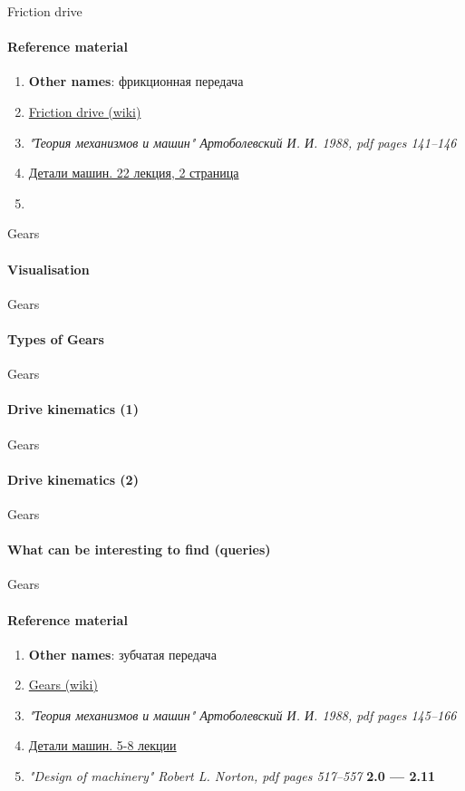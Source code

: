 \documentclass[aspectratio=169]{beamer}
\begin{document}
\begin{frame}[t]{Friction drive}
    \framesubtitle{Reference material}
    \begin{enumerate}
        \item \textbf{Other names}: фрикционная передача
        \item \href{https://en.m.wikipedia.org/wiki/Friction_drive}{Friction drive (wiki)}
        \item \textit{"Теория механизмов и машин" Артоболевский И. И. 1988, pdf pages 141--146 }
        \item \href{https://studfile.net/preview/2156467/page:2/}{Детали машин. 22 лекция, 2 страница}
        \item 
    \end{enumerate}
\end{frame}

\begin{frame}[t]{Gears}
    \framesubtitle{Visualisation}

\end{frame}

\begin{frame}[t]{Gears}
    \framesubtitle{Types of Gears}

\end{frame}

\begin{frame}[t]{Gears}
    \framesubtitle{Drive kinematics (1)}

\end{frame}

\begin{frame}[t]{Gears}
    \framesubtitle{Drive kinematics (2)}

\end{frame}

\begin{frame}[t]{Gears}
    \framesubtitle{What can be interesting to find (queries)}

\end{frame}

\begin{frame}[t]{Gears}
    \framesubtitle{Reference material}
    \begin{enumerate}
        \item \textbf{Other names}: зубчатая передача
        \item \href{https://en.wikipedia.org/wiki/Gear}{Gears (wiki)}
        \item \textit{"Теория механизмов и машин" Артоболевский И. И. 1988, pdf pages 145--166 }
        \item \href{https://studfile.net/preview/2156468/}{Детали машин. 5-8 лекции}
        \item \textit{"Design of machinery" Robert L. Norton, pdf pages 517--557 } \textbf{2.0 --- 2.11}
    \end{enumerate}
\end{frame}
\end{document}
